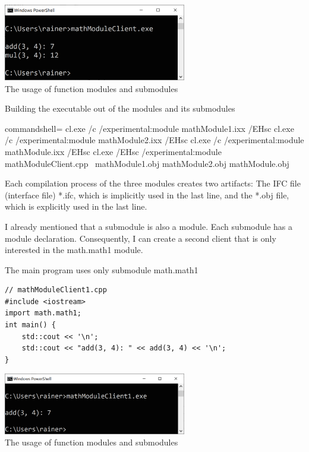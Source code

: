 \begin{center}
\includegraphics[width=0.6\textwidth]{content/3/chapter4/images/21.png}\\
The usage of function modules and submodules
\end{center}

\begin{tcolorbox}[colback=blue!5!white,colframe=blue!75!black,title=Building the Executable with the Microsoft Compiler]
	
\noindent
Building the executable out of the modules and its submodules
\begin{tcblisting}{commandshell={}}
cl.exe /c /experimental:module mathModule1.ixx /EHsc
cl.exe /c /experimental:module mathModule2.ixx /EHsc
cl.exe /c /experimental:module mathModule.ixx /EHsc
cl.exe /EHsc /experimental:module mathModuleClient.cpp \
  mathModule1.obj mathModule2.obj mathModule.obj
\end{tcblisting}

Each compilation process of the three modules creates two artifacts: The IFC file (interface file) *.ifc, which is implicitly used in the last line, and the *.obj file, which is explicitly used in the last line.

\end{tcolorbox}

I already mentioned that a submodule is also a module. Each submodule has a module declaration. Consequently, I can create a second client that is only interested in the math.math1 module.

\noindent
The main program uses only submodule math.math1
\begin{lstlisting}[style=styleCXX]
// mathModuleClient1.cpp
#include <iostream>
import math.math1;
int main() {
	std::cout << '\n';
	std::cout << "add(3, 4): " << add(3, 4) << '\n';
}
\end{lstlisting}

\begin{center}
\includegraphics[width=0.6\textwidth]{content/3/chapter4/images/22.png}\\
The usage of function modules and submodules
\end{center}

